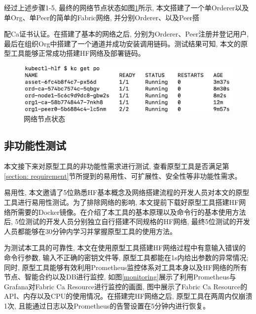 经过上述步骤1-5, 最终的网络节点状态如图\ref{fabric_result}所示, 本文搭建了一个单Orderer以及单Org、单Peer的简单的Fabric网络, 并分别Orderer、以及Peer搭

\newpage

\noindent
配Ca证书认证。在搭建了基本的网络之后, 分别为Orderer、Peer注册并登记用户, 最后在组织Org中搭建了一个通道并成功安装调用链码。测试结果可知, 本文的原型工具能够正常成功搭建HF网络及部署链码。


\begin{figure}[h] %
    \centering %
    \includegraphics[width=1.0\textwidth]{FIGs/chapter5/fabric_result.png} %
    \caption{网络节点状态} %
    \label{fabric_result} %
\end{figure}%


\subsection{非功能性测试}

本文接下来对原型工具的非功能性需求进行测试, 查看原型工具是否满足第\ref{section: requirement}节所提到的易用性、可扩展性、安全性等非功能性需求。

易用性, 本文邀请了5位熟悉HF基本概念及网络搭建流程的开发人员对本文的原型工具进行易用性测试。为了排除网络的影响,
本文提前下载好原型工具搭建HF网络所需要的Docker镜像。在介绍了本工具的基本原理以及命令行的基本使用方法后, 5位测试的开发人员分别独立自行搭建不同规格的HF网络, 最终5位测试的开发人员都能够在30分钟内学习并掌握原型工具的使用方法。

为测试本工具的可靠性, 本文在使用原型工具搭建HF网络过程中有意输入错误的命令行参数, 输入不正确的密钥文件等, 原型工具都能在1s内给出参数的异常情况; 同时, 原型工具能够有效利用Prometheus监控体系对工具本身以及HF网络的所有节点、智能合约以及DB进行监控, 如图\ref{monitoring}展示了利用Prometheus与Grafana对Fabric Ca Resource进行监控的画面, 图中展示了Fabric Ca Resource的API、内存以及CPU的使用情况。在搭建完HF网络之后, 原型工具在两周内仅崩溃1次, 且能通过日志以及Prometheus的告警设置在5分钟内进行恢复。

